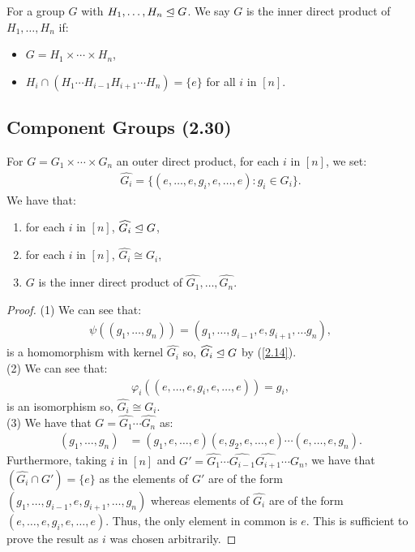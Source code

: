 For a group $G$ with $H_1, \ldots, H_n \trianglelefteq G$. We say $G$ is the
inner direct product of $H_1, \ldots, H_n$ if: \begin{itemize}
    \item $G = H_1 \times \cdots \times H_n$,
    \item $H_i \cap (H_1 \cdots H_{i - 1} H_{i + 1} \cdots H_n) = \{e\}$ 
        for all $i$ in $[n]$.  
\end{itemize}

\newpage

\subsection{Component Groups (2.30)} \label{2.30}

For $G = G_1 \times \cdots \times G_n$ an outer direct product, 
for each $i$ in $[n]$, we set: \begin{align*}
    \widehat{G_i} = \{(e, \ldots, e, g_i, e, \ldots, e) : g_i \in G_i\}.
\end{align*} We have that: \begin{enumerate}
    \item for each $i$ in $[n]$, $\widehat{G_i} \trianglelefteq G$,
    \item for each $i$ in $[n]$, $\widehat{G_i} \cong G_i$,
    \item $G$ is the inner direct product of $\widehat{G_1}, \ldots, \widehat{G_n}$.
\end{enumerate}

\begin{proof}
    (1) We can see that: \begin{align*}
        \psi((g_1, \ldots, g_n)) = (g_1, \ldots, g_{i - 1}, e, g_{i + 1}, \ldots g_n),
    \end{align*} is a homomorphism with kernel $\widehat{G_i}$ so, $\widehat{G_i} \trianglelefteq G$
    by (\ref{2.14}).
    \\[\baselineskip]
    (2) We can see that: \begin{align*}
        \varphi_i((e, \ldots, e, g_i, e, \ldots, e)) = g_i,
    \end{align*} is an isomorphism so, $\widehat{G_i} \cong G_i$.
    \\[\baselineskip]
    (3) We have that $G = \widehat{G_1} \cdots \widehat{G_n}$ as:
    \begin{align*}
        (g_1, \ldots, g_n)
        &= (g_1, e, \ldots, e)(e, g_2, e, \ldots, e)
        \cdots (e, \ldots, e, g_n).
    \end{align*} Furthermore, taking $i$ in $[n]$ and $G' = \widehat{G_1} \cdots 
    \widehat{G_{i - 1}} \widehat{G_{i + 1}} \cdots G_n$, we have that \linebreak 
    $(\widehat{G_i} \cap G') = \{e\}$ as the elements of $G'$ are of the form
    $(g_1, \ldots, g_{i - 1}, e, g_{i + 1}, \ldots, g_n)$ whereas elements
    of $\widehat{G_i}$ are of the form $(e, \ldots, e, g_i, e, \ldots, e)$.
    Thus, the only element in common is $e$. This is sufficient to prove the result
    as $i$ was chosen arbitrarily.
\end{proof}

